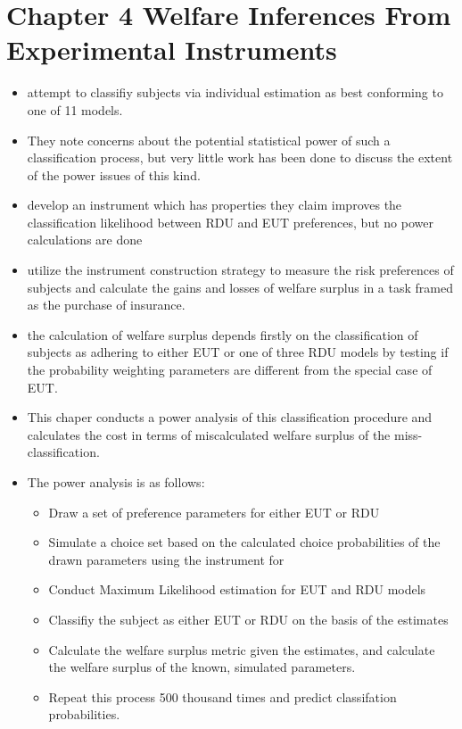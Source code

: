 \documentclass[12pt,a4paper]{article}\usepackage[]{graphicx}\usepackage[]{color}
\begin{document}
\section{Chapter 4 Welfare Inferences From Experimental Instruments}
	\begin{itemize}
		\item \textcite{Hey1994} attempt to classifiy subjects via individual estimation as best conforming to one of 11 models.
		\item They note concerns about the potential statistical power of such a classification process, but very little work has been done to discuss the extent of the power issues of this kind.
		\item \textcite{Loomes2002} develop an instrument which has properties they claim improves the classification likelihood between RDU and EUT preferences, but no power calculations are done
		\item \textcite{Harrison2016} utilize the instrument construction strategy to measure the risk preferences of subjects and calculate the gains and losses of welfare surplus in a task framed as the purchase of insurance.
		\item \textcite{Harrison2016} the calculation of welfare surplus depends firstly on the classification of subjects as adhering to either EUT or one of three RDU models by testing if the probability weighting parameters are different from the special case of EUT.
		\item This chaper conducts a power analysis of this classification procedure and calculates the cost in terms of miscalculated welfare surplus of the miss-classification.
		\item The power analysis is as follows:
			\begin{itemize}
				\item Draw a set of preference parameters for either EUT or RDU
				\item Simulate a choice set based on the calculated choice probabilities of the drawn parameters using the instrument for \textcite{Harrison2016}
				\item Conduct Maximum Likelihood estimation for EUT and RDU models
				\item Classifiy the subject as either EUT or RDU on the basis of the estimates
				\item Calculate the welfare surplus metric given the estimates, and calculate the welfare surplus of the known, simulated parameters.
				\item Repeat this process 500 thousand times and predict classifation probabilities.

\end{itemize}
\end{itemize}
\end{document}
